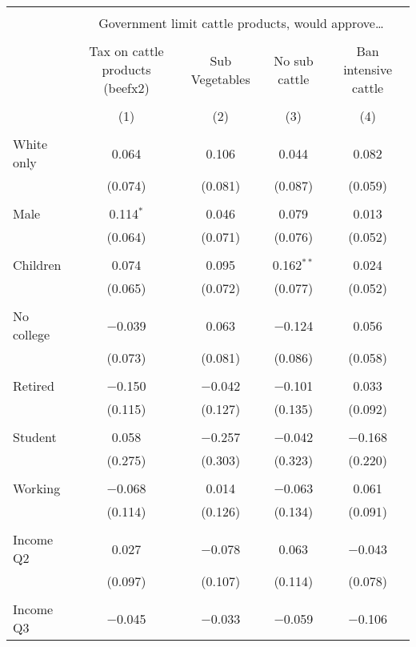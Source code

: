 
\begin{tabular}{@{\extracolsep{5pt}}lcccc} 
\\[-1.8ex]\hline 
\hline \\[-1.8ex] 
 & \multicolumn{4}{c}{Government limit cattle products, would approve…} \\ 
\cline{2-5} 
\\[-1.8ex] & Tax on cattle products (beefx2) & Sub Vegetables & No sub cattle & Ban intensive cattle \\ 
\\[-1.8ex] & (1) & (2) & (3) & (4)\\ 
\hline \\[-1.8ex] 
 White only & 0.064 & 0.106 & 0.044 & 0.082 \\ 
  & (0.074) & (0.081) & (0.087) & (0.059) \\ 
  & & & & \\ 
 Male & 0.114$^{*}$ & 0.046 & 0.079 & 0.013 \\ 
  & (0.064) & (0.071) & (0.076) & (0.052) \\ 
  & & & & \\ 
 Children & 0.074 & 0.095 & 0.162$^{**}$ & 0.024 \\ 
  & (0.065) & (0.072) & (0.077) & (0.052) \\ 
  & & & & \\ 
 No college & $-$0.039 & 0.063 & $-$0.124 & 0.056 \\ 
  & (0.073) & (0.081) & (0.086) & (0.058) \\ 
  & & & & \\ 
 Retired & $-$0.150 & $-$0.042 & $-$0.101 & 0.033 \\ 
  & (0.115) & (0.127) & (0.135) & (0.092) \\ 
  & & & & \\ 
 Student & 0.058 & $-$0.257 & $-$0.042 & $-$0.168 \\ 
  & (0.275) & (0.303) & (0.323) & (0.220) \\ 
  & & & & \\ 
 Working & $-$0.068 & 0.014 & $-$0.063 & 0.061 \\ 
  & (0.114) & (0.126) & (0.134) & (0.091) \\ 
  & & & & \\ 
 Income Q2 & 0.027 & $-$0.078 & 0.063 & $-$0.043 \\ 
  & (0.097) & (0.107) & (0.114) & (0.078) \\ 
  & & & & \\ 
 Income Q3 & $-$0.045 & $-$0.033 & $-$0.059 & $-$0.106 \\ 

\end{tabular}
